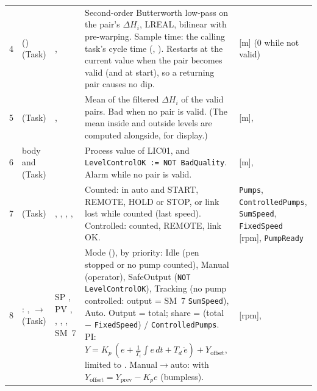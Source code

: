 \documentclass[11pt]{article}
\newcommand{\code}[1]{\texttt{#1}}
\begin{document}
\begin{landscape}
\begin{longtable}{@{}cP{33mm}P{48mm}P{80mm}P{50mm}@{}}
4 &  () (Task) &
  ,  &
  Second-order Butterworth low-pass on the pair's $\Delta H_i$, LREAL, bilinear with
  pre-warping. Sample time: the calling task's cycle time (,
  ). Restarts at the current value when
  the pair becomes valid (and at start), so a returning pair causes no dip. &
   [m] (0 while not valid) \\
5 &  (Task) &
  ,  &
  Mean of the filtered $\Delta H_i$ of the valid pairs. Bad when no pair is valid. (The mean
  inside and outside levels are computed alongside, for display.) &
   [m],  \\
6 &  body and  (Task) &
   &
  Process value of LIC01, and \code{LevelControlOK := NOT BadQuality}. Alarm
   while no pair is valid. &
   [m],  \\
7 &  (Task) &
  , , ,
  ,  &
  Counted: in auto and START, REMOTE, HOLD or STOP, or link lost while counted (last speed).
  Controlled: counted, REMOTE, link OK. &
  \code{Pumps}, \code{ControlledPumps}, \code{SumSpeed}, \code{FixedSpeed} [rpm], \code{PumpReady} \\
8 & : ,  $\to$  (Task) &
  SP , PV ,
  , ,
  , SM~7 &
  Mode (), by priority: Idle (pen stopped or no pump counted), Manual
  (operator), SafeOutput (\code{NOT LevelControlOK}), Tracking (no pump controlled: output = SM~7
  \code{SumSpeed}), Auto. Output = total; share = (total $-$ \code{FixedSpeed}) / \code{ControlledPumps}.
  PI: $Y = K_p\,(e + \tfrac{1}{T_i}\int e\,dt + T_d\,\dot e) + Y_\text{offset}$, limited to
  . Manual$\to$auto:  with
  $Y_\text{offset} = Y_\text{prev} - K_p e$ (bumpless). &
   [rpm],

\end{longtable}
\end{landscape}
\end{document}
